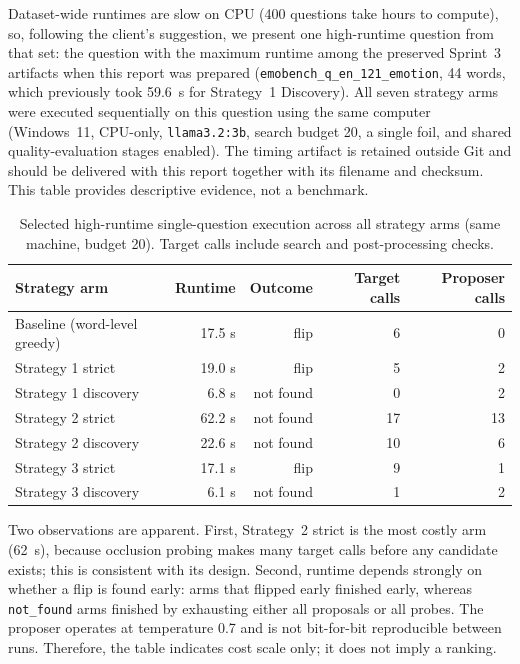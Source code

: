 \documentclass[11pt,a4paper]{article}
\begin{document}
Dataset-wide runtimes are slow on CPU (400 questions take hours to compute), so,
following the client's suggestion, we present one high-runtime question from that set:
the question with the maximum runtime among the preserved Sprint~3 artifacts when
this report was prepared (\texttt{emobench\_q\_en\_121\_emotion}, 44 words, which
previously took 59.6~s for Strategy~1 Discovery). All seven strategy arms were
executed sequentially on this question using the same computer (Windows~11, CPU-only,
\texttt{llama3.2:3b}, search budget 20, a single foil, and shared quality-evaluation
stages enabled). The timing artifact is retained outside Git and should be delivered
with this report together with its filename and checksum. This table provides
descriptive evidence, not a benchmark.

\begin{table}[htbp]
\centering
\small
\begin{tabularx}{\textwidth}{@{}Y r r r r@{}}
\toprule
\textbf{Strategy arm} & \textbf{Runtime} & \textbf{Outcome} & \textbf{Target calls} & \textbf{Proposer calls} \\
\midrule
Baseline (word-level greedy) & 17.5 s & flip & 6 & 0 \\
Strategy 1 strict & 19.0 s & flip & 5 & 2 \\
Strategy 1 discovery & 6.8 s & not found & 0 & 2 \\
Strategy 2 strict & 62.2 s & not found & 17 & 13 \\
Strategy 2 discovery & 22.6 s & not found & 10 & 6 \\
Strategy 3 strict & 17.1 s & flip & 9 & 1 \\
Strategy 3 discovery & 6.1 s & not found & 1 & 2 \\
\bottomrule
\end{tabularx}
\caption{Selected high-runtime single-question execution across all strategy arms
(same machine, budget 20). Target calls include search and post-processing checks.}
\label{tab:runtime}
\end{table}

Two observations are apparent. First, Strategy~2 strict is the most costly arm
(62~s), because occlusion probing makes many target calls before any candidate exists;
this is consistent with its design. Second, runtime depends strongly on whether a flip
is found early: arms that flipped early finished early, whereas \texttt{not\_found}
arms finished by exhausting either all proposals or all probes. The proposer operates
at temperature 0.7 and is not bit-for-bit reproducible between runs. Therefore, the
table indicates cost scale only; it does not imply a ranking.
\end{document}
